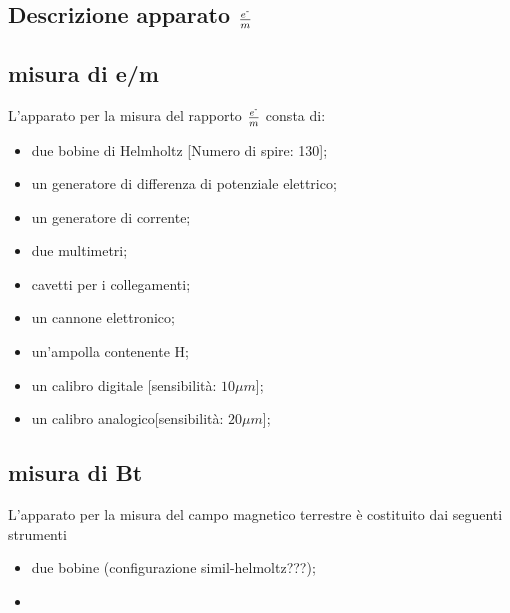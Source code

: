 \subsection{Descrizione apparato $\frac{e^{\textrm{-}}}{m}$}
\subsection{misura di e/m}
L'apparato per la misura del rapporto $\frac{e^{\textrm{-}}}{m}$ consta di:
\begin{itemize}
  \item due bobine di Helmholtz [Numero di spire: 130];
  \item un generatore di differenza di potenziale elettrico;
  \item un generatore di corrente;
  \item due multimetri;
  \item cavetti per i collegamenti;
  \item un cannone elettronico;
  \item un'ampolla contenente H;
  \item un calibro digitale [sensibilità: $10\mu m$];
  \item un calibro analogico[sensibilità: $20\mu m$];
\end{itemize}

\subsection{misura di Bt}
L'apparato per la misura del campo magnetico terrestre è costituito dai seguenti strumenti
\begin{itemize}
  \item due bobine (configurazione simil-helmoltz???);
  \item 
\end{itemize}
